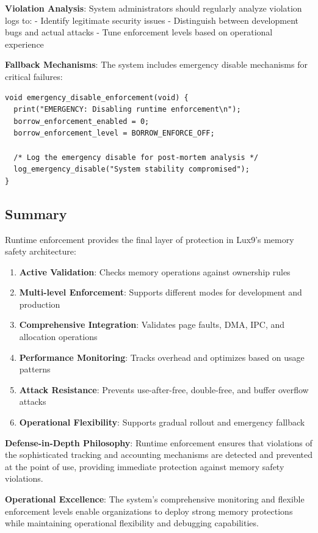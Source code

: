 \documentclass[11pt,letterpaper]{article}
\begin{document}
\textbf{Violation Analysis}: System administrators should regularly analyze violation logs to:
- Identify legitimate security issues
- Distinguish between development bugs and actual attacks
- Tune enforcement levels based on operational experience

\textbf{Fallback Mechanisms}: The system includes emergency disable mechanisms for critical failures:

\begin{lstlisting}
void emergency_disable_enforcement(void) {
  print("EMERGENCY: Disabling runtime enforcement\n");
  borrow_enforcement_enabled = 0;
  borrow_enforcement_level = BORROW_ENFORCE_OFF;
  
  /* Log the emergency disable for post-mortem analysis */
  log_emergency_disable("System stability compromised");
}
\end{lstlisting}

\subsection{Summary}

Runtime enforcement provides the final layer of protection in Lux9's memory safety architecture:

\begin{enumerate}
\item \textbf{Active Validation}: Checks memory operations against ownership rules
\item \textbf{Multi-level Enforcement}: Supports different modes for development and production
\item \textbf{Comprehensive Integration}: Validates page faults, DMA, IPC, and allocation operations
\item \textbf{Performance Monitoring}: Tracks overhead and optimizes based on usage patterns
\item \textbf{Attack Resistance}: Prevents use-after-free, double-free, and buffer overflow attacks
\item \textbf{Operational Flexibility}: Supports gradual rollout and emergency fallback
\end{enumerate}

\textbf{Defense-in-Depth Philosophy}: Runtime enforcement ensures that violations of the sophisticated tracking and accounting mechanisms are detected and prevented at the point of use, providing immediate protection against memory safety violations.

\textbf{Operational Excellence}: The system's comprehensive monitoring and flexible enforcement levels enable organizations to deploy strong memory protections while maintaining operational flexibility and debugging capabilities.
\end{document}
